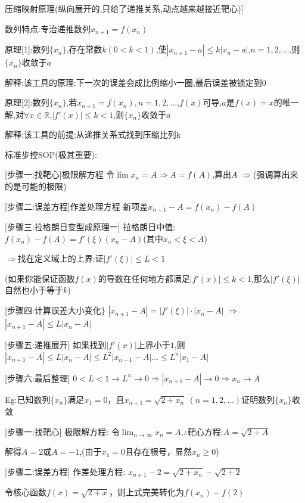 \documentclass[11pt,a4paper,UTF8]{ctexart}
\begin{document}
\begin{thmbox}[[4]压缩映射原理(纵向展开的,只给了递推关系,动点越来越接近靶心)]

数列特点:专治递推数列$x_{n+1} = f(x_n)$

原理[1]:数列$\{x_n\}$,存在常数$k (0 < k < 1)$,使$|x_{n+1} - a| \le k|x_n - a|$,$n=1,2,\dots$,则$\{x_n\}$收敛于$a$

  解释:该工具的原理:下一次的误差会成比例缩小一圈,最后误差被锁定到0

原理[2]:数列$\{x_n\}$,若$x_{n+1} = f(x_n), n=1,2,\dots$,$f(x)$可导,$a$是$f(x)=x$的唯一解,对$\forall x \in \mathbb{R}$,$|f'(x)| \le k < 1$,则$\{x_n\}$收敛于$a$

  解释:该工具的前提:从递推关系式找到压缩比列k

标准步控SOP(极其重要):

  [步骤一:找靶心]极限解方程  	令$\lim x_n = A \Rightarrow A = f(A)$,算出$A$ $\Rightarrow$(强调算出来的是可能的极限)

  [步骤二:误差方程]作差处理方程      新项差$x_{n+1} - A = f(x_n) - f(A)$

  [步骤三:拉格朗日变型成原理一]      拉格朗日中值:$f(x_n) - f(A) = f'(\xi)(x_n - A)$(其中$x_n < \xi < A$)

  				$\Rightarrow$找在定义域上的上界:证$|f'(\xi)| \le L < 1$

  				(如果你能保证函数$f(x)$的导数在任何地方都满足$\vert{}f'(x)\vert{} \le k < 1$,那么$\vert{}f'(\xi)\vert{}$自然也小于等于$k$)

  [步骤四:计算误差大小变化\}	$|x_{n+1} - A| = |f'(\xi)| \cdot |x_n - A|$ $\Rightarrow$ $|x_{n+1} - A| \le L|x_n - A|$

  [步骤五:递推展开]		 如果找到$|f'(x)|$上界小于$1$,则$|x_{n+1} - A| \le L|x_n - A| \le L^2|x_{n-1} - A| \dots \le L^n|x_1 - A|$

  [步骤六:最后整理] 		$0 < L < 1 \to L^n \to 0 \Rightarrow |x_{n+1} - A| \to 0 \Rightarrow x_n \to A$

Eg:已知数列$\{x_n\}$满足$x_1 = 0$，且$x_{n+1} = \sqrt{2 + x_n}\ (n=1,2,\dots)$证明数列$\{x_n\}$收敛

[步骤一:找靶心] 极限解方程:	    令$\lim_{n \to \infty} x_n = A$,$\therefore$靶心方程:$A = \sqrt{2 + A}$

  解得$A = 2$或$A = -1$,(由于$x_1 = 0$且存在根号，显然$x_n \ge 0$)

[步骤二:误差方程] 作差处理方程:	$x_{n+1} - 2 = \sqrt{2 + x_n} - \sqrt{2 + 2}$

  令核心函数$f(x) = \sqrt{2 + x}$，则上式完美转化为$f(x_n) - f(2)$


\end{thmbox}
\end{document}
